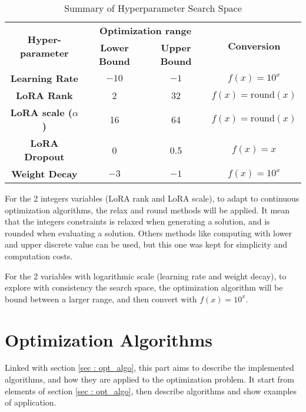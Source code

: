 \begin{table}[h]
    \centering
    \begin{tabular}{|c|c|c|c|}
        \hline
        \multirow{2}{*}{\textbf{Hyper-parameter}} & \multicolumn{2}{|c|}{\textbf{Optimization range}} & \multirow{2}{*}{\textbf{Conversion}} \\
        \cline{2-3}
         & \textbf{Lower Bound} & \textbf{Upper Bound} &  \\
        \hline
        \textbf{Learning Rate} & $-10$ & $-1$ & $f(x) = 10^{x}$ \\
        \hline
        \textbf{LoRA Rank} & 2 & 32 & $f(x) = \text{round}(x)$ \\
        \hline
        \textbf{LoRA scale ($\alpha$)} & 16 & 64 & $f(x) = \text{round}(x)$ \\
        \hline
        \textbf{LoRA Dropout} & 0 & 0.5 & $f(x) = x$ \\
        \hline
        \textbf{Weight Decay} & $-3$ & $-1$ & $f(x) = 10^{x}$  \\
        \hline
    \end{tabular}
    \caption{Summary of Hyperparameter Search Space}
    \label{tab:hyperparam_table}
\end{table}

For the 2 integers variables (LoRA rank and LoRA scale), to adapt to continuous optimization algorithms, the relax and round methods will be applied. It mean that the integers constraints is relaxed when generating a solution, and is rounded when evaluating a solution. Others methods like computing with lower and upper discrete value can be used, but this one was kept for simplicity and computation costs.

For the 2 variables with logarithmic scale (learning rate and weight decay), to explore with consistency the search space, the optimization algorithm will be bound between a larger range, and then convert with $f(x)=10^{x}$.

\section{Optimization Algorithms}
\label{sec:opt}
Linked with section \ref{sec : opt_algo}, this part aims to describe the implemented algorithms, and how they are applied to the optimization problem. It start from elements of section \ref{sec : opt_algo}, then describe algorithms and show examples of application.

